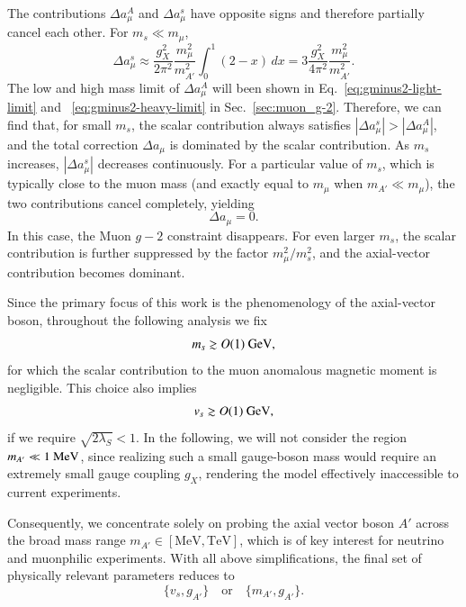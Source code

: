 \documentclass[onecolumn, aps, nofootinbib, prd, preprint, floats, floatfix, amsmath, amssymb, superscriptaddress, preprintnumbers]{revtex4-1}
\begin{document}
The contributions $\Delta a_\mu^A$ and $\Delta a_\mu^s$ have opposite signs and therefore partially cancel each other.
For
$m_s\ll m_\mu$,
\begin{equation}
\Delta a^s_\mu
\approx
\frac{g_X^2}{2\pi^2}
\frac{m_\mu^2}{m_{A'}^2}
\int_0^1(2-x)\,dx
=
3
\frac{g_X^2}{4\pi^2}
\frac{m_\mu^2}{m_{A'}^2}.
\end{equation}
The low and high mass limit of $\Delta a^A_\mu$ will been shown in Eq.~\eqref{eq:gminus2-light-limit} and ~\eqref{eq:gminus2-heavy-limit} in Sec.~\ref{sec:muon_g-2}.
Therefore, we can find that, for small $m_s$, the scalar contribution always satisfies
$|\Delta a_\mu^s|>|\Delta a_\mu^A|$,
and the total correction $\Delta a_\mu$ is dominated by the scalar contribution.
As $m_s$ increases, $|\Delta a_\mu^s|$ decreases continuously.
For a particular value of $m_s$, which is typically close to the muon mass (and exactly equal to $m_\mu$ when $m_{A'}\ll m_\mu$), the two contributions cancel completely, yielding
\begin{equation}
\Delta a_\mu=0.
\end{equation}
In this case, the Muon $g-2$ constraint disappears.
For even larger $m_s$, the scalar contribution is further suppressed by the factor
$m_\mu^2/m_s^2$,
and the axial-vector contribution becomes dominant.

Since the primary focus of this work is the phenomenology of the axial-vector boson, throughout the following analysis we fix
\begin{equation}
m_s \gtrsim O(1)~{\rm GeV},
\end{equation}
for which the scalar contribution to the muon anomalous magnetic moment is negligible.
This choice also implies
\begin{equation}
v_s \gtrsim  O(1)~{\rm GeV},
\end{equation}
if we require $\sqrt{2 \lambda_S} < 1$.
In the following, we will not consider the region
$m_{A'}\ll1~{\rm MeV}$,
since realizing such a small gauge-boson mass would require an extremely small gauge coupling $g_X$, rendering the model effectively inaccessible to current experiments.  

Consequently, we concentrate solely on probing the axial vector boson $A'$ across the broad mass range $m_{A'}\in [\mathrm{MeV}, \mathrm{TeV}]$, which is of key interest for neutrino and muonphilic experiments. With all above simplifications, the final set of physically relevant parameters reduces to
\begin{equation}
    \{v_s, g_{A'}\} \quad \text{or} \quad \{m_{A'}, g_{A'}\}.
\end{equation}
\end{document}

